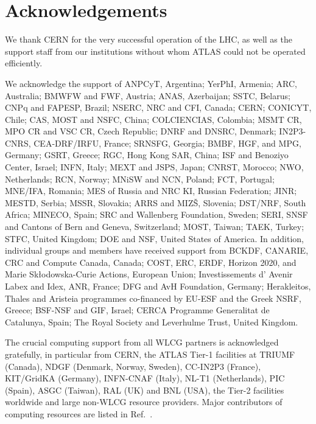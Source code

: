 \documentclass[PAPER, coverpage, atlasdraft=true, texlive=2016, UKenglish]{\ATLASLATEXPATH atlasdoc}
\begin{document}
\section*{Acknowledgements}

We thank CERN for the very successful operation of the LHC, as well as the
support staff from our institutions without whom ATLAS could not be
operated efficiently.

We acknowledge the support of ANPCyT, Argentina; YerPhI, Armenia; ARC, Australia; BMWFW and FWF, Austria; ANAS, Azerbaijan; SSTC, Belarus; CNPq and FAPESP, Brazil; NSERC, NRC and CFI, Canada; CERN; CONICYT, Chile; CAS, MOST and NSFC, China; COLCIENCIAS, Colombia; MSMT CR, MPO CR and VSC CR, Czech Republic; DNRF and DNSRC, Denmark; IN2P3-CNRS, CEA-DRF/IRFU, France; SRNSFG, Georgia; BMBF, HGF, and MPG, Germany; GSRT, Greece; RGC, Hong Kong SAR, China; ISF and Benoziyo Center, Israel; INFN, Italy; MEXT and JSPS, Japan; CNRST, Morocco; NWO, Netherlands; RCN, Norway; MNiSW and NCN, Poland; FCT, Portugal; MNE/IFA, Romania; MES of Russia and NRC KI, Russian Federation; JINR; MESTD, Serbia; MSSR, Slovakia; ARRS and MIZ\v{S}, Slovenia; DST/NRF, South Africa; MINECO, Spain; SRC and Wallenberg Foundation, Sweden; SERI, SNSF and Cantons of Bern and Geneva, Switzerland; MOST, Taiwan; TAEK, Turkey; STFC, United Kingdom; DOE and NSF, United States of America. In addition, individual groups and members have received support from BCKDF, CANARIE, CRC and Compute Canada, Canada; COST, ERC, ERDF, Horizon 2020, and Marie Sk{\l}odowska-Curie Actions, European Union; Investissements d' Avenir Labex and Idex, ANR, France; DFG and AvH Foundation, Germany; Herakleitos, Thales and Aristeia programmes co-financed by EU-ESF and the Greek NSRF, Greece; BSF-NSF and GIF, Israel; CERCA Programme Generalitat de Catalunya, Spain; The Royal Society and Leverhulme Trust, United Kingdom. 

The crucial computing support from all WLCG partners is acknowledged gratefully, in particular from CERN, the ATLAS Tier-1 facilities at TRIUMF (Canada), NDGF (Denmark, Norway, Sweden), CC-IN2P3 (France), KIT/GridKA (Germany), INFN-CNAF (Italy), NL-T1 (Netherlands), PIC (Spain), ASGC (Taiwan), RAL (UK) and BNL (USA), the Tier-2 facilities worldwide and large non-WLCG resource providers. Major contributors of computing resources are listed in Ref.~\cite{ATL-GEN-PUB-2016-002}.
\end{document}
